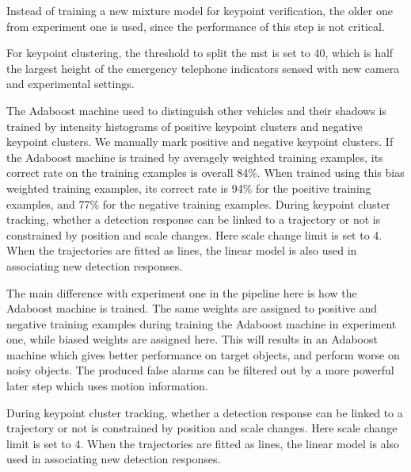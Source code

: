 Instead of training a new mixture model for keypoint verification, the older one from experiment one is used, since the performance of this step is not critical.

For keypoint clustering, the threshold to split the mst is set to 40, which is half the largest height of the emergency telephone indicators sensed with new camera and experimental settings.


The Adaboost machine used to distinguish other vehicles and their shadows is trained by intensity histograms of positive keypoint clusters and negative keypoint clusters. We manually mark  positive  and  negative keypoint clusters. If the Adaboost machine is trained by averagely weighted training examples, its correct rate on the training examples is overall 84\%. When trained using this bias weighted training examples, its correct rate is  94\% for the positive training examples, and 77\% for the negative training examples.
During keypoint cluster tracking, whether a detection response can be linked to a trajectory or not is constrained by position and scale changes. Here scale change limit is set to 4. When the trajectories are fitted as lines, the linear model is also used in associating new detection responses.

The main difference with experiment one in the pipeline here is how the Adaboost machine is trained. The same weights are assigned to positive and negative training examples during training the Adaboost machine in experiment one, while biased weights are assigned here. This will results in an Adaboost machine which gives better performance on target objects, and perform worse on noisy objects. The produced false alarms can be  filtered out by a more powerful later step which uses motion information.

During keypoint cluster tracking, whether a detection response can be linked to a trajectory or not is constrained by position and scale changes. Here scale change limit is set to 4. When the trajectories are fitted as lines, the linear model is also used in associating new detection responses.



